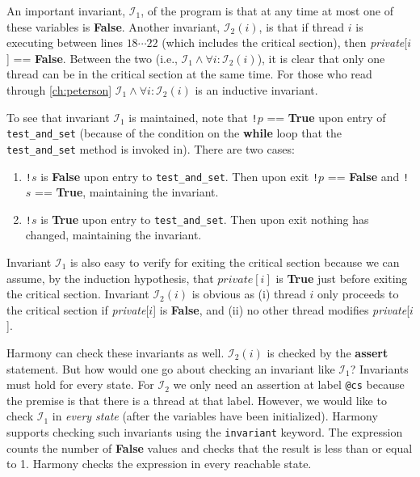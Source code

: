 \documentclass{report}
\begin{document}
An important invariant, $\mathcal{I}_1$, of the program is that at any time at most
one of these variables is \textbf{False}.
Another invariant, $\mathcal{I}_2(i)$, is that if thread $i$ is executing between
lines $18 \cdots 22$ (which includes the critical section),
then \textit{private}[$i$] == \textbf{False}.
Between the two (i.e., $\mathcal{I}_1 \land \forall i: \mathcal{I}_2(i)$),
it is clear that only one thread can be in the
critical section at the same time.
For those who read through \autoref{ch:peterson}
$\mathcal{I}_1 \land \forall i: \mathcal{I}_2(i)$ is an inductive invariant.

To see that invariant $\mathcal{I}_1$ is maintained, note that
\texttt{!}$p$ == \textbf{True} upon entry of \texttt{test\_and\_set}
(because of the condition on the \textbf{while} loop that the
\texttt{test\_and\_set} method is invoked in).
There are two cases:
\begin{enumerate}
\item \texttt{!}$s$ is \textbf{False} upon entry to \texttt{test\_and\_set}.
Then upon exit \texttt{!}$p$ == \textbf{False} and \texttt{!}$s$ == \textbf{True},
maintaining the invariant.
\item \texttt{!}$s$ is \textbf{True} upon entry to \texttt{test\_and\_set}.
Then upon exit nothing has changed, maintaining the invariant.
\end{enumerate}
Invariant $\mathcal{I}_1$ is also easy to verify for exiting the critical section
because we can assume, by the induction hypothesis, that $\textit{private}[i]$ is
\textbf{True} just before exiting the critical section.
Invariant $\mathcal{I}_2(i)$ is obvious as (i) thread $i$ only proceeds to the critical
section if \textit{private}[$i$] is \textbf{False}, and (ii) no other thread modifies
\textit{private}[$i$].

Harmony can check these invariants as well.
$\mathcal{I}_2(i)$ is checked by the \textbf{assert} statement.
But how would one go about checking an
invariant like $\mathcal{I}_1$?  Invariants must hold for every state.
For $\mathcal{I}_2$ we only need an assertion at label \texttt{@cs} because the
premise is that there is a thread at that label.  However, we would
like to check $\mathcal{I}_1$ in \emph{every state} (after the variables have
been initialized).
Harmony supports checking such invariants using the \texttt{invariant}
keyword.
The expression counts the number of \textbf{False} values and checks that
the result is less than or equal to 1.
Harmony checks the expression in every reachable state.
\end{document}

